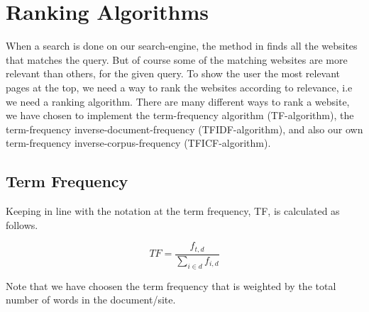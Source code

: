 \section{Ranking Algorithms}
\label{sec:rankingAlgorithms}
When a search is done on our search-engine, the method  in  finds all the websites that matches the query. But of course some of the matching websites are more relevant than others, for the given query. To show the user the most relevant pages at the top, we need a way to rank the websites according to relevance, i.e we need a ranking algorithm. There are many different ways to rank a website, we have chosen to implement the term-frequency algorithm (TF-algorithm), the term-frequency inverse-document-frequency (TFIDF-algorithm), and also our own  term-frequency inverse-corpus-frequency (TFICF-algorithm).    

\subsection{Term Frequency}
Keeping in line with the notation at \cite{wikiTFIDF} the term frequency, TF, is calculated as follows.

\[ TF = \frac{f_{t,d}}{\sum_{i \in d}f_{i,d}} \]

Note that we have choosen the term frequency that is weighted by the total number of words in the document/site. %

